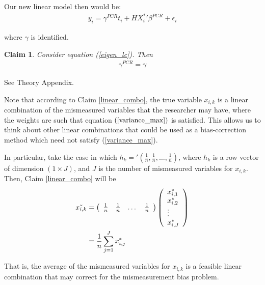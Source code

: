 \documentclass[10pt]{article}
\makeatletter
\newtheorem{claim}{Claim}
\renewenvironment{proof}[1][\proofname] {\par\pushQED{\qed}\normalfont\topsep6\p@\@plus6\p@\relax\trivlist\item[\hskip\labelsep\bfseries#1\@addpunct{.}]\ignorespaces}{\popQED\endtrivlist\@endpefalse}
\makeatother
\begin{document}
        Our new linear model then would be:
        \begin{align} \label{eigen_lc}
            y_i = \gamma^{PCR} t_i + H{X^*_i}'\beta^{PCR} + \epsilon_i
        \end{align}
        
        where $\gamma$ is identified.

        \begin{claim}
        Consider equation (\ref{eigen_lc}). Then
            \begin{align}
                {\gamma}^{PCR} = \gamma
            \end{align}
        \end{claim}

        \begin{proof}
            See Theory Appendix.
        \end{proof}
        
        Note that according to Claim \ref{linear_combo}, the true variable $x_{i,k}$ is a linear combination of the mismeasured variables that the researcher may have, where the weights are such that equation $(\ref{variance_max})$ is satisfied. This allows us to think about other linear combinations that could be used as a bias-correction method which need not satisfy (\ref{variance_max}). 
        
        In particular, take the case in which $h_k='(\frac{1}{n},\frac{1}{n},\dots,\frac{1}{n})$, where $h_k$ is a row vector of dimension $(1\times J)$, and $J$ is the number of mismeasured variables for $x_{i,k}$. Then, Claim \ref{linear_combo} will be
        \begin{align}
            \Tilde{x_{i,k}}&=\left(\begin{array}{cccc}
            \frac{1}{n} & \frac{1}{n} & \dots &\frac{1}{n} 
            \end{array}\right)\left(\begin{array}{l}
            x^*_{i,1} \\
            x^*_{i,2} \\
            \vdots \\
            x^*_{i,J} 
            \end{array}\right)\\
            &=\frac{1}{n}\sum_{j=1}^J x^*_{i,j}
        \end{align}
        
        That is, the average of the mismeasured variables for $x_{i,k}$ is a feasible linear combination that may correct for the mismeasurement bias problem.
\end{document}
